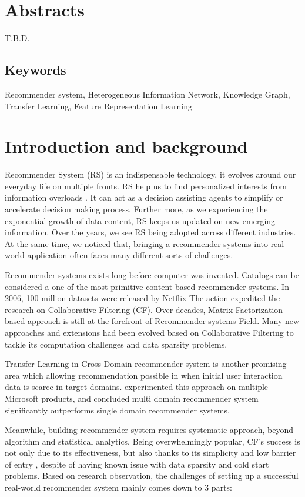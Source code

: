 
\section*{Abstracts}
T.B.D.

\subsection*{Keywords} 
Recommender system, Heterogeneous Information Network, Knowledge Graph, Transfer Learning, Feature Representation Learning

\section{Introduction and background}
Recommender System (RS) is an indispensable technology, it evolves around our everyday life on multiple fronts. RS help us to find personalized interests from information overloads \citep{Lu2015}. It can act as a decision assisting agents to simplify or accelerate decision making process. Further more, as we experiencing the exponential growth of data content, RS keeps us updated on new emerging information.
Over the years, we see RS being adopted across different industries. At the same time, we noticed that, bringing a recommender systems into real-world application often faces many different sorts of challenges. 

Recommender systems exists long before computer was invented. Catalogs can be considered a one of the most primitive content-based recommender systems. In 2006, 100 million datasets were released by Netflix \citep{Bennett2007} The action expedited the research on Collaborative Filtering (CF). Over decades, Matrix Factorization based approach is still at the forefront of Recommender systems Field. Many new approaches and extensions had been evolved based on Collaborative Filtering to tackle its computation challenges and data sparsity problems. 

Transfer Learning \citep{Pan2010} in Cross Domain recommender system is another promising area which allowing recommendation possible in when initial user interaction data is scarce in target domains. \citet{Elkahky2015} experimented this approach on multiple Microsoft products, and concluded multi domain recommender system significantly outperforms single domain recommender systems. 


Meanwhile, building recommender system requires systematic approach, beyond algorithm and statistical analytics. Being overwhelmingly popular, CF's success is not only due to its effectiveness, but also thanks to its simplicity and low barrier of entry \citep{Amatriain2016}, despite of having known issue with data sparsity and cold start problems. Based on research observation, the challenges of setting up a successful real-world recommender system mainly comes down to 3 parts:  

